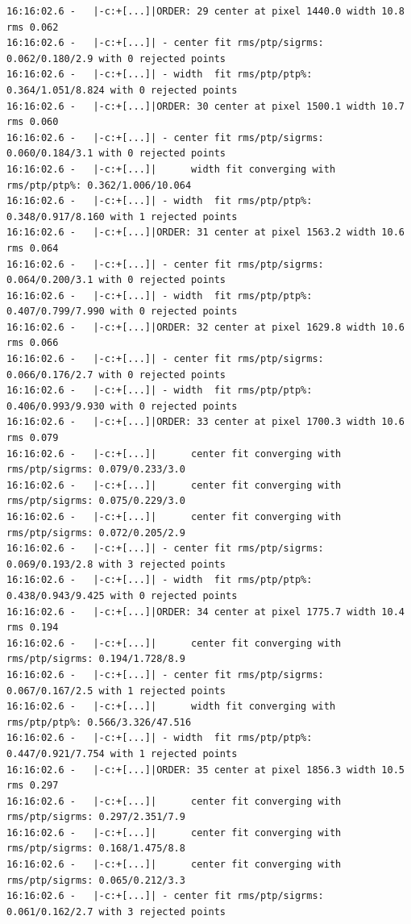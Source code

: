 \begin{lstlisting}[style=text]
16:16:02.6 -   |-c:+[...]|ORDER: 29 center at pixel 1440.0 width 10.8 rms 0.062
16:16:02.6 -   |-c:+[...]| - center fit rms/ptp/sigrms: 0.062/0.180/2.9 with 0 rejected points
16:16:02.6 -   |-c:+[...]| - width  fit rms/ptp/ptp%: 0.364/1.051/8.824 with 0 rejected points
16:16:02.6 -   |-c:+[...]|ORDER: 30 center at pixel 1500.1 width 10.7 rms 0.060
16:16:02.6 -   |-c:+[...]| - center fit rms/ptp/sigrms: 0.060/0.184/3.1 with 0 rejected points
16:16:02.6 -   |-c:+[...]|      width fit converging with rms/ptp/ptp%: 0.362/1.006/10.064
16:16:02.6 -   |-c:+[...]| - width  fit rms/ptp/ptp%: 0.348/0.917/8.160 with 1 rejected points
16:16:02.6 -   |-c:+[...]|ORDER: 31 center at pixel 1563.2 width 10.6 rms 0.064
16:16:02.6 -   |-c:+[...]| - center fit rms/ptp/sigrms: 0.064/0.200/3.1 with 0 rejected points
16:16:02.6 -   |-c:+[...]| - width  fit rms/ptp/ptp%: 0.407/0.799/7.990 with 0 rejected points
16:16:02.6 -   |-c:+[...]|ORDER: 32 center at pixel 1629.8 width 10.6 rms 0.066
16:16:02.6 -   |-c:+[...]| - center fit rms/ptp/sigrms: 0.066/0.176/2.7 with 0 rejected points
16:16:02.6 -   |-c:+[...]| - width  fit rms/ptp/ptp%: 0.406/0.993/9.930 with 0 rejected points
16:16:02.6 -   |-c:+[...]|ORDER: 33 center at pixel 1700.3 width 10.6 rms 0.079
16:16:02.6 -   |-c:+[...]|      center fit converging with rms/ptp/sigrms: 0.079/0.233/3.0
16:16:02.6 -   |-c:+[...]|      center fit converging with rms/ptp/sigrms: 0.075/0.229/3.0
16:16:02.6 -   |-c:+[...]|      center fit converging with rms/ptp/sigrms: 0.072/0.205/2.9
16:16:02.6 -   |-c:+[...]| - center fit rms/ptp/sigrms: 0.069/0.193/2.8 with 3 rejected points
16:16:02.6 -   |-c:+[...]| - width  fit rms/ptp/ptp%: 0.438/0.943/9.425 with 0 rejected points
16:16:02.6 -   |-c:+[...]|ORDER: 34 center at pixel 1775.7 width 10.4 rms 0.194
16:16:02.6 -   |-c:+[...]|      center fit converging with rms/ptp/sigrms: 0.194/1.728/8.9
16:16:02.6 -   |-c:+[...]| - center fit rms/ptp/sigrms: 0.067/0.167/2.5 with 1 rejected points
16:16:02.6 -   |-c:+[...]|      width fit converging with rms/ptp/ptp%: 0.566/3.326/47.516
16:16:02.6 -   |-c:+[...]| - width  fit rms/ptp/ptp%: 0.447/0.921/7.754 with 1 rejected points
16:16:02.6 -   |-c:+[...]|ORDER: 35 center at pixel 1856.3 width 10.5 rms 0.297
16:16:02.6 -   |-c:+[...]|      center fit converging with rms/ptp/sigrms: 0.297/2.351/7.9
16:16:02.6 -   |-c:+[...]|      center fit converging with rms/ptp/sigrms: 0.168/1.475/8.8
16:16:02.6 -   |-c:+[...]|      center fit converging with rms/ptp/sigrms: 0.065/0.212/3.3
16:16:02.6 -   |-c:+[...]| - center fit rms/ptp/sigrms: 0.061/0.162/2.7 with 3 rejected points

\end{lstlisting}
